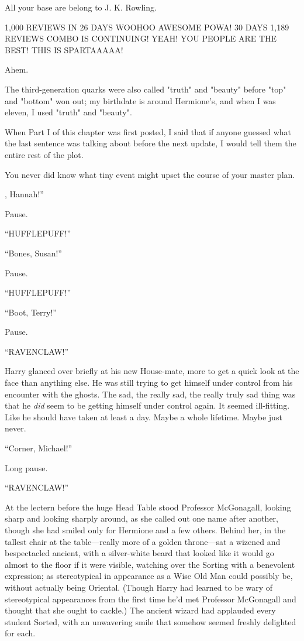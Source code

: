 
\begin{chapterOpeningAuthorNote}
All your base are belong to J. K. Rowling.

1,000 REVIEWS IN 26 DAYS WOOHOO AWESOME POWA! 30 DAYS 1,189 REVIEWS COMBO IS CONTINUING! YEAH! YOU PEOPLE ARE THE BEST! THIS IS SPARTAAAAA!

Ahem.

The third-generation quarks were also called "truth" and "beauty" before "top" and "bottom" won out; my birthdate is around Hermione's, and when I was eleven, I used "truth" and "beauty".

When Part I of this chapter was first posted, I said that if anyone guessed what the last sentence was talking about before the next update, I would tell them the entire rest of the plot.
\end{chapterOpeningAuthorNote}
\begin{chapterOpeningQuote}
You never did know what tiny event might upset the course of your master plan.
\end{chapterOpeningQuote}

, Hannah!”

\hplettrineextrapara
Pause.

“HUFFLEPUFF!”

“Bones, Susan!”

Pause.

“HUFFLEPUFF!”

“Boot, Terry!”

Pause.

“RAVENCLAW!”

Harry glanced over briefly at his new House-mate, more to get a quick look at the face than anything else. He was still trying to get himself under control from his encounter with the ghosts. The sad, the really sad, the really truly sad thing was that he \emph{did} seem to be getting himself under control again. It seemed ill-fitting. Like he should have taken at least a day. Maybe a whole lifetime. Maybe just never.

“Corner, Michael!”

Long pause.

“RAVENCLAW!”

At the lectern before the huge Head Table stood Professor McGonagall, looking sharp and looking sharply around, as she called out one name after another, though she had smiled only for Hermione and a few others. Behind her, in the tallest chair at the table—really more of a golden throne—sat a wizened and bespectacled ancient, with a silver-white beard that looked like it would go almost to the floor if it were visible, watching over the Sorting with a benevolent expression; as stereotypical in appearance as a Wise Old Man could possibly be, without actually being Oriental. (Though Harry had learned to be wary of stereotypical appearances from the first time he’d met Professor McGonagall and thought that she ought to cackle.) The ancient wizard had applauded every student Sorted, with an unwavering smile that somehow seemed freshly delighted for each.

